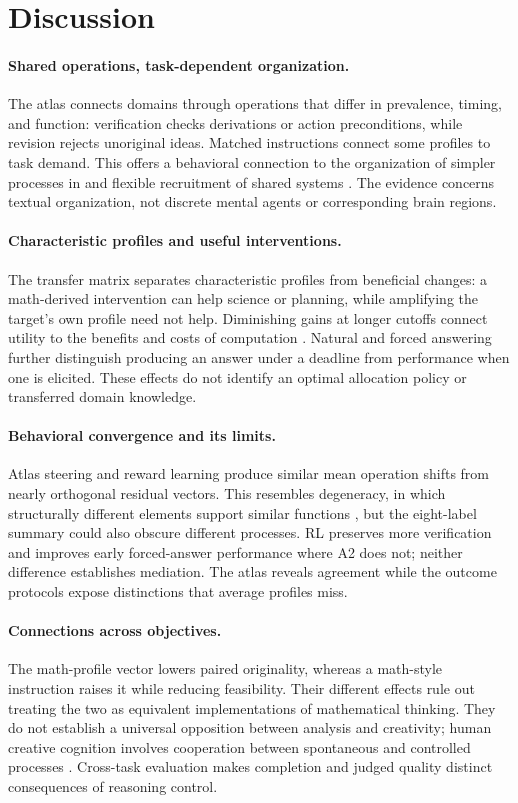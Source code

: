 \section{Discussion}
\paragraph{Shared operations, task-dependent organization.}
The atlas connects domains through operations that differ in prevalence, timing, and function: verification checks derivations or action preconditions, while revision rejects unoriginal ideas. Matched instructions connect some profiles to task demand. This offers a behavioral connection to the organization of simpler processes in \citet{minsky1986society} and flexible recruitment of shared systems \citep{cole2013hubs}. The evidence concerns textual organization, not discrete mental agents or corresponding brain regions.

\paragraph{Characteristic profiles and useful interventions.}
The transfer matrix separates characteristic profiles from beneficial changes: a math-derived intervention can help science or planning, while amplifying the target's own profile need not help. Diminishing gains at longer cutoffs connect utility to the benefits and costs of computation \citep{shenhav2013control,lieder2020resource}. Natural and forced answering further distinguish producing an answer under a deadline from performance when one is elicited. These effects do not identify an optimal allocation policy or transferred domain knowledge.

\paragraph{Behavioral convergence and its limits.}
Atlas steering and reward learning produce similar mean operation shifts from nearly orthogonal residual vectors. This resembles degeneracy, in which structurally different elements support similar functions \citep{edelman2001degeneracy}, but the eight-label summary could also obscure different processes. RL preserves more verification and improves early forced-answer performance where A2 does not; neither difference establishes mediation. The atlas reveals agreement while the outcome protocols expose distinctions that average profiles miss.

\paragraph{Connections across objectives.}
The math-profile vector lowers paired originality, whereas a math-style instruction raises it while reducing feasibility. Their different effects rule out treating the two as equivalent implementations of mathematical thinking. They do not establish a universal opposition between analysis and creativity; human creative cognition involves cooperation between spontaneous and controlled processes \citep{beaty2015creative}. Cross-task evaluation makes completion and judged quality distinct consequences of reasoning control.

